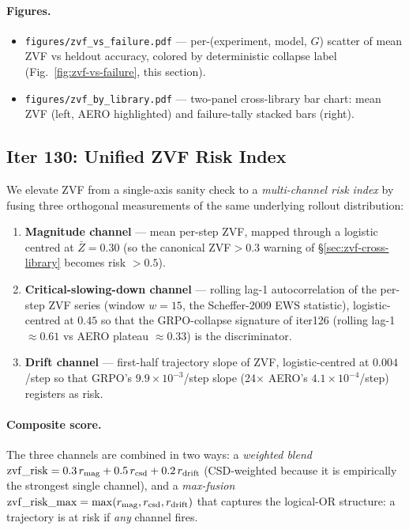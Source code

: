 \documentclass{article}
\begin{document}
\paragraph{Figures.}
\begin{itemize}
\item \texttt{figures/zvf_vs_failure.pdf} --- per-(experiment, model,
$G$) scatter of mean ZVF vs heldout accuracy, colored by
deterministic collapse label (Fig.~\ref{fig:zvf-vs-failure}, this
section).
\item \texttt{figures/zvf_by_library.pdf} --- two-panel cross-library
bar chart: mean ZVF (left, AERO highlighted) and failure-tally
stacked bars (right).
\end{itemize}

\subsection{Iter 130: Unified ZVF Risk Index}
\label{sec:zvf-risk-index}
We elevate ZVF from a single-axis sanity check to a \emph{multi-channel
risk index} by fusing three orthogonal measurements of the same
underlying rollout distribution:
\begin{enumerate}
\item \textbf{Magnitude channel} --- mean per-step ZVF, mapped through a
logistic centred at $\bar{Z}{=}0.30$ (so the canonical ZVF${>}0.3$ warning
of \S\ref{sec:zvf-cross-library} becomes risk $>0.5$).
\item \textbf{Critical-slowing-down channel} --- rolling lag-1
autocorrelation of the per-step ZVF series (window $w{=}15$, the
Scheffer-2009 EWS statistic), logistic-centred at $0.45$ so that the
GRPO-collapse signature of iter126 (rolling lag-1 $\approx 0.61$ vs
AERO plateau $\approx 0.33$) is the discriminator.
\item \textbf{Drift channel} --- first-half trajectory slope of ZVF,
logistic-centred at $0.004$/step so that GRPO's $9.9{\times}10^{-3}$/step
slope (24$\times$ AERO's $4.1{\times}10^{-4}$/step) registers as risk.
\end{enumerate}

\paragraph{Composite score.} The three channels are combined in two
ways: a \emph{weighted blend} $\mathrm{zvf\_risk} = 0.3\,r_{\rm mag}
+ 0.5\,r_{\rm csd} + 0.2\,r_{\rm drift}$ (CSD-weighted because it is
empirically the strongest single channel), and a \emph{max-fusion}
$\mathrm{zvf\_risk\_max} = \max(r_{\rm mag}, r_{\rm csd}, r_{\rm drift})$
that captures the logical-OR structure: a trajectory is at risk if
\emph{any} channel fires.
\end{document}
